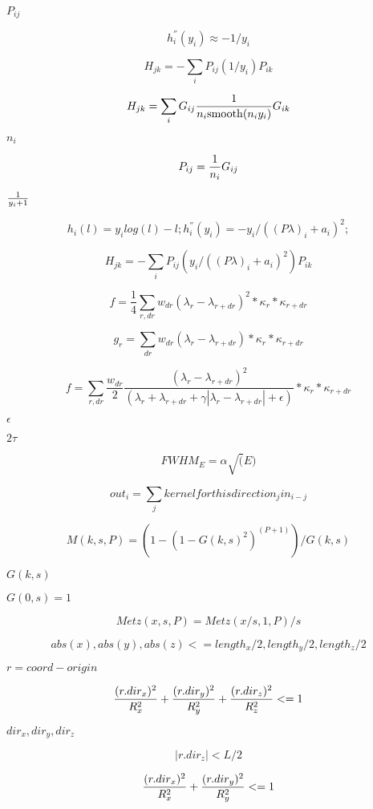 \documentclass{article}
\begin{document}
$P_{ij} $
\pagebreak

\[ h_i^{''}(y_i) \approx -1/y_i \]
\pagebreak

\[ H_{jk} = - \sum_i P_{ij}(1/y_i) P_{ik} \]
\pagebreak

\[ H_{jk} = \sum_i G_{ij}{1 \over n_i \mathrm{smooth}( n_i y_i)} G_{ik} \]
\pagebreak

$n_i$
\pagebreak

\[ P_{ij} = {1 \over n_i } G_{ij}\]
\pagebreak

$1 \over y_i+1 $
\pagebreak

\[ h_i(l) = y_i log (l) - l; h_i^{''}(y_i) = - y_i / ((P \lambda)_i + a_i)^2; \]
\pagebreak

\[ H_{jk} = - \sum_i P_{ij}(y_i / ((P \lambda)_i + a_i)^2) P_{ik} \]
\pagebreak

\[ f = \frac{1}{4} \sum_{r,dr} w_{dr} (\lambda_r - \lambda_{r+dr})^2 * \kappa_r * \kappa_{r+dr} \]
\pagebreak

\[ g_r = \sum_{dr} w_{dr} (\lambda_r - \lambda_{r+dr}) * \kappa_r * \kappa_{r+dr} \]
\pagebreak

\[ f= \sum_{r,dr} \frac{w_{dr}}{2} \frac{(\lambda_r - \lambda_{r+dr})^2}{(\lambda_r+ \lambda_{r+dr} + \gamma |\lambda_r - \lambda_{r+dr}| + \epsilon)} * \kappa_r * \kappa_{r+dr} \]
\pagebreak

$\epsilon$
\pagebreak

$2\tau$
\pagebreak

\[ FWHM_E = \alpha \sqrt(E) \]
\pagebreak

\[ out_i = \sum_j kernelforthisdirection_j in_{i-j} \]
\pagebreak

\[ M(k,s,P) = (1 - (1 - G(k, s)^2)^{(P + 1)})/ G(k, s) \]
\pagebreak

$ G(k,s) $
\pagebreak

$G(0,s) = 1$
\pagebreak

\[ Metz(x,s,P) = Metz(x/s, 1 ,P)/s \]
\pagebreak

\[ abs(x), abs(y), abs(z) <= length_x/2, length_y/2, length_z/2 \]
\pagebreak

$r = coord - origin$
\pagebreak

\[ {(r.dir_x)^2 \over R_x^2} + {(r.dir_y)^2 \over R_y^2} + {(r.dir_z)^2 \over R_z^2} <= 1 \]
\pagebreak

$dir_x, dir_y, dir_z$
\pagebreak

\[ |r.dir_z|<L/2 \]
\pagebreak

\[ {(r.dir_x)^2 \over R_x^2} + {(r.dir_y)^2 \over R_y^2} <= 1 \]
\pagebreak
\end{document}
